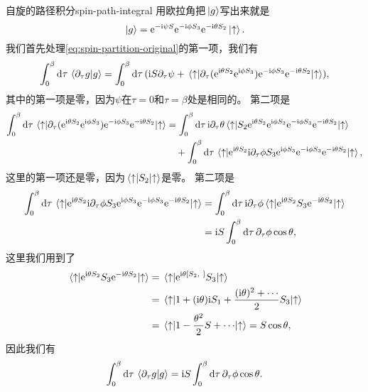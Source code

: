 \begin{back}{自旋的路径积分}{spin-path-integral}
    用欧拉角把$\ket*{g}$写出来就是
    \[
        \ket*{g} = \mathrm{e}^{- \mathrm{i} \psi S} \mathrm{e}^{- \mathrm{i} \phi S_3} \mathrm{e}^{- \mathrm{i} \theta S_2} \ket*{\uparrow}.
    \]
    我们首先处理\eqref{eq:spin-partition-original}的第一项，我们有
    \[
        \int_0^\beta \dd{\tau} \braket*{\partial_\tau g}{g} = \int_0^\beta \dd{\tau} (\mathrm{i} S \partial_\tau \psi + \mel*{\uparrow}{\partial_\tau (\mathrm{e}^{\mathrm{i} \theta S_2} \mathrm{e}^{\mathrm{i} \phi S_3}) \mathrm{e}^{- \mathrm{i} \phi S_3} \mathrm{e}^{- \mathrm{i} \theta S_2}}{\uparrow} ),
    \]
    其中的第一项是零，因为$\psi$在$\tau = 0$和$\tau = \beta$处是相同的。
    第二项是
    \[
        \begin{aligned}
            \int_0^\beta \dd{\tau} \mel*{\uparrow}{\partial_\tau (\mathrm{e}^{\mathrm{i} \theta S_2} \mathrm{e}^{\mathrm{i} \phi S_3}) \mathrm{e}^{- \mathrm{i} \phi S_3} \mathrm{e}^{- \mathrm{i} \theta S_2}}{\uparrow} &= \int_0^\beta \dd{\tau} \mathrm{i} \partial_\tau \theta \mel*{\uparrow}{S_2 \mathrm{e}^{\mathrm{i} \theta S_2} \mathrm{e}^{\mathrm{i} \phi S_3} \mathrm{e}^{- \mathrm{i} \phi S_3} \mathrm{e}^{- \mathrm{i} \theta S_2}}{\uparrow} \\
            &\quad + \int_0^\beta \dd{\tau} \mel*{\uparrow}{\mathrm{e}^{\mathrm{i} \theta S_2} \mathrm{i} \partial_\tau \phi S_3 \mathrm{e}^{\mathrm{i} \phi S_3} \mathrm{e}^{- \mathrm{i} \phi S_3} \mathrm{e}^{- \mathrm{i} \theta S_2}}{\uparrow},
        \end{aligned}
    \]
    这里的第一项还是零，因为$\mel*{\uparrow}{S_2}{\uparrow}$是零。
    第二项是
    \[
        \begin{aligned}
            \int_0^\beta \dd{\tau} \mel*{\uparrow}{\mathrm{e}^{\mathrm{i} \theta S_2} \mathrm{i} \partial_\tau \phi S_3 \mathrm{e}^{\mathrm{i} \phi S_3} \mathrm{e}^{- \mathrm{i} \phi S_3} \mathrm{e}^{- \mathrm{i} \theta S_2}}{\uparrow} &= \int_0^\beta \dd{\tau} \mathrm{i} \partial_\tau \phi \mel*{\uparrow}{\mathrm{e}^{\mathrm{i} \theta S_2} S_3 \mathrm{e}^{- \mathrm{i} \theta S_2}}{\uparrow} \\
            &= \mathrm{i} S \int_0^\beta \dd{\tau} \partial_\tau \phi \cos \theta,
        \end{aligned}
    \]
    这里我们用到了
    \[
        \begin{aligned}
            \mel*{\uparrow}{\mathrm{e}^{\mathrm{i} \theta S_2} S_3 \mathrm{e}^{- \mathrm{i} \theta S_2}}{\uparrow} &= \mel*{\uparrow}{\mathrm{e}^{\mathrm{i} \theta [S_2, \ ]} S_3}{\uparrow} \\
            &= \mel*{\uparrow}{1 + (\mathrm{i} \theta) \mathrm{i} S_1 + \frac{(\mathrm{i} \theta)^2 + \cdots}{2} S_3 }{\uparrow} \\
            &= \mel*{\uparrow}{1 - \frac{\theta^2}{2} S + \cdots}{\uparrow} = S \cos \theta, 
        \end{aligned}
    \]
    因此我们有
    \begin{equation}
        \int_0^\beta \dd{\tau} \braket*{\partial_\tau g}{g} = \mathrm{i} S \int_0^\beta \dd{\tau} \partial_\tau \phi \cos \theta.
    \end{equation}


\end{back}
